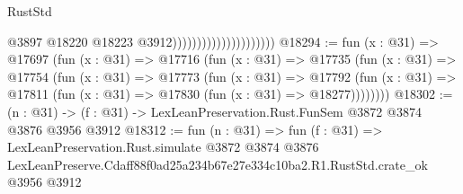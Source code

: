 \begin{lexlean}{RustStd}
\begin{coremodule}
                                              @3897
                                              @18220
                                              @18223
                                              @3912)))))))))))))))))))))
@18294 := fun (x : @31) =>
  @17697
    (fun (x : @31) =>
    @17716
      (fun (x : @31) =>
      @17735
        (fun (x : @31) =>
        @17754
          (fun (x : @31) =>
          @17773
            (fun (x : @31) =>
            @17792
              (fun (x : @31) => @17811 (fun (x : @31) => @17830 (fun (x : @31) => @18277))))))))
@18302 := (n : @31) -> (f : @31) -> LexLeanPreservation.Rust.FunSem @3872 @3874 @3876 @3956 @3912
@18312 := fun (n : @31) =>
  fun (f : @31) =>
  LexLeanPreservation.Rust.simulate
    @3872
    @3874
    @3876
    LexLeanPreserve.Cdaff88f0ad25a234b67e27e334c10ba2.R1.RustStd.crate_ok
    @3956
    @3912
\end{coremodule}
\end{lexlean}
